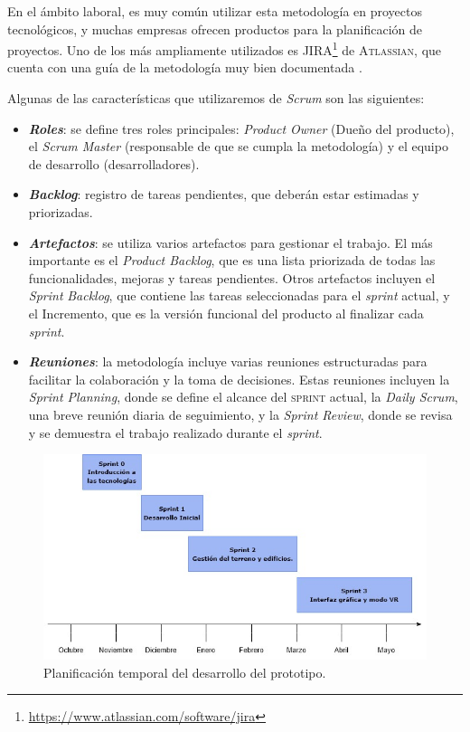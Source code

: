 \documentclass[a4paper, 11pt]{book}
\begin{document}
En el ámbito laboral, es muy común utilizar esta metodología en proyectos tecnológicos, y muchas empresas ofrecen productos para la planificación de proyectos. Uno de los más ampliamente utilizados es \textsc{JIRA}\footnote{\url{https://www.atlassian.com/software/jira}} de \textsc{Atlassian}, que cuenta con una guía de la metodología muy bien documentada \cite{scrumGuide}.

\noindent Algunas de las características que utilizaremos de \emph{Scrum} son las siguientes:
\begin{itemize}
\item \textbf{\emph{Roles}}: se define tres roles principales: \emph{Product Owner} (Dueño del producto), el \emph{Scrum Master} (responsable de que se cumpla la metodología) y el equipo de desarrollo (desarrolladores).
\item \textbf{\emph{Backlog}}: registro de tareas pendientes, que deberán estar estimadas y priorizadas.
\item \textbf{\emph{Artefactos}}: se utiliza varios artefactos para gestionar el trabajo. El más importante es el \emph{Product Backlog}, que es una lista priorizada de todas las funcionalidades, mejoras y tareas pendientes. Otros artefactos incluyen el \emph{Sprint} \emph{Backlog}, que contiene las tareas seleccionadas para el \emph{sprint} actual, y el Incremento, que es la versión funcional del producto al finalizar cada \emph{sprint}.
\item \textbf{\emph{Reuniones}}: la metodología incluye varias reuniones estructuradas para facilitar la colaboración y la toma de decisiones. Estas reuniones incluyen la \emph{Sprint Planning}, donde se define el alcance del \textsc{sprint} actual, la \emph{Daily Scrum}, una breve reunión diaria de seguimiento, y la \emph{Sprint Review}, donde se revisa y se demuestra el trabajo realizado durante el \emph{sprint}.
\end{itemize}

\begin{figure}[h]
  \centering
  \includegraphics[width=12cm, keepaspectratio]{img/scrum.jpg}
  \caption{Planificación temporal del desarrollo del prototipo.}
  \label{fig:scrum}
\end{figure}
\end{document}
